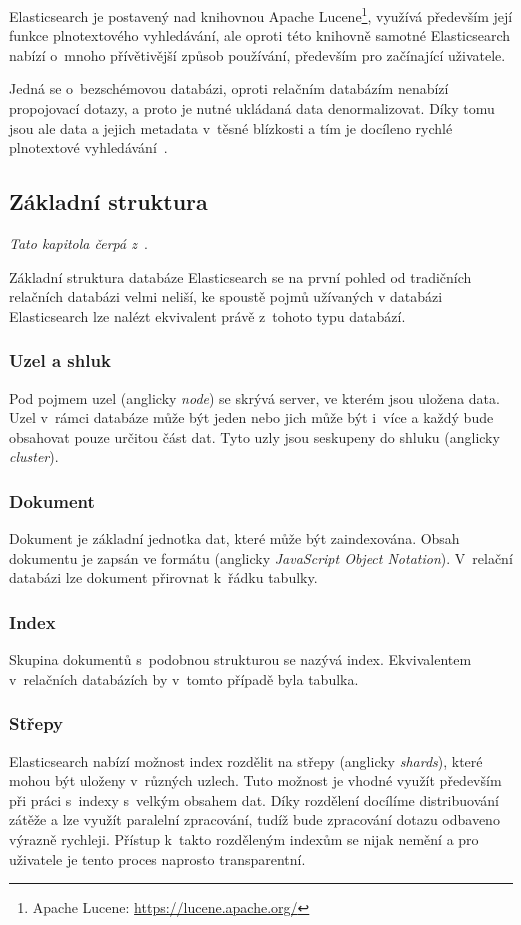 Elasticsearch je postavený nad knihovnou Apache Lucene\footnote{Apache Lucene: \url{https://lucene.apache.org/}}, využívá především její funkce plnotextového vyhledávání, ale oproti této knihovně samotné Elasticsearch nabízí o~mnoho přívětivější způsob používání, především pro začínající uživatele. 

Jedná se o~bezschémovou databázi, oproti relačním databázím nenabízí propojovací dotazy, a proto je nutné ukládaná data denormalizovat. Díky tomu jsou ale data a jejich metadata v~těsné blízkosti a tím je docíleno rychlé plnotextové vyhledávání~\cite{bib:elastic-what-is}.

\subsection{Základní struktura}
\emph{Tato kapitola čerpá z~\cite{bib:elastic-concept}}.

Základní struktura databáze Elasticsearch se na první pohled od tradičních relačních databázi velmi neliší, ke spoustě pojmů užívaných v databázi Elasticsearch lze nalézt ekvivalent právě z~tohoto typu databází.

\subsubsection*{Uzel a shluk}
Pod pojmem uzel (anglicky \emph{node}) se skrývá server, ve kterém jsou uložena data. Uzel v~rámci databáze může být jeden nebo jich může být i~více a každý bude obsahovat pouze určitou část dat. Tyto uzly jsou seskupeny do shluku (anglicky \emph{cluster}).

\subsubsection*{Dokument}\label{section:dokument}
Dokument je základní jednotka dat, které může být zaindexována. Obsah dokumentu je zapsán ve formátu (anglicky \emph{JavaScript Object Notation}). V~relační databázi lze dokument přirovnat k~řádku tabulky.

\subsubsection*{Index}\label{section:index}
Skupina dokumentů s~podobnou strukturou se nazývá index. Ekvivalentem v~relačních databázích by v~tomto případě byla tabulka.

\subsubsection*{Střepy}
Elasticsearch nabízí možnost index rozdělit na střepy (anglicky \emph{shards}), které mohou být uloženy v~různých uzlech. Tuto možnost je vhodné využít především při práci s~indexy s~velkým obsahem dat. Díky rozdělení docílíme distribuování zátěže a lze využít paralelní zpracování, tudíž bude zpracování dotazu odbaveno výrazně rychleji. 
Přístup k~takto rozděleným indexům se nijak nemění a pro uživatele je tento proces naprosto transparentní.

